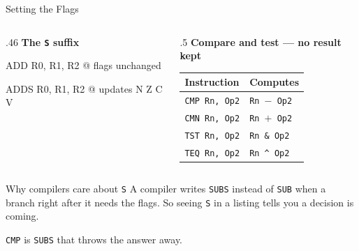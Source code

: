 \documentclass[9pt,aspectratio=169,xcolor=table]{beamer}
\begin{document}
\begin{frame}[fragile]{Setting the Flags}
    \begin{columns}[T]
    \begin{column}{.46\textwidth}
        \textbf{The \texttt{S} suffix}

        \vspace{1mm}
        \begin{asm}[basicstyle=\footnotesize\ttfamily]
ADD   R0, R1, R2  @ flags unchanged

ADDS  R0, R1, R2  @ updates N Z C V
\end{asm}
    \end{column}
    \begin{column}{.5\textwidth}
        \textbf{Compare and test --- no result kept}

        \vspace{1mm}
        {\small
        \striped
        \begin{tabular}{@{}l l@{}}
            \toprule
            \textbf{Instruction} & \textbf{Computes} \\
            \midrule
            \texttt{CMP Rn, Op2} & \texttt{Rn $-$ Op2} \\
            \texttt{CMN Rn, Op2} & \texttt{Rn $+$ Op2} \\
            \texttt{TST Rn, Op2} & \texttt{Rn \& Op2} \\
            \texttt{TEQ Rn, Op2} & \texttt{Rn \^{} Op2} \\
            \bottomrule
        \end{tabular}}
    \end{column}
    \end{columns}

    \vspace{3mm}
    \begin{block}{Why compilers care about \texttt{S}}
        A compiler writes \texttt{SUBS} instead of \texttt{SUB} when a
        branch right after it needs the flags. So seeing \texttt{S} in a
        listing tells you \alert{a decision is coming}.
    \end{block}

    \vspace{1mm}
    {\small \texttt{CMP} is \texttt{SUBS} that throws the answer away.}
\end{frame}
\end{document}

